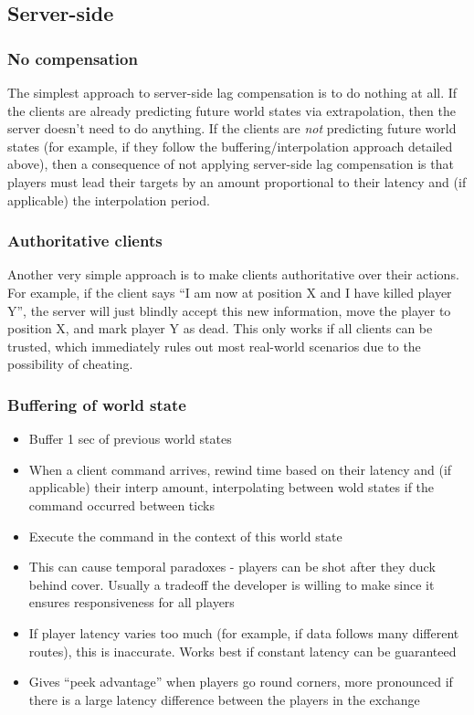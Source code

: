 \documentclass[conference]{IEEEtran}
\begin{document}
	\subsection{Server-side}

	\subsubsection{No compensation}

	The simplest approach to server-side lag compensation is to do nothing at all. If the clients are already predicting future world states via extrapolation, then the server doesn't need to do anything. If the clients are \emph{not} predicting future world states (for example, if they follow the buffering/interpolation approach detailed above), then a consequence of not applying server-side lag compensation is that players must lead their targets by an amount proportional to their latency and (if applicable) the interpolation period.

	\subsubsection{Authoritative clients}

	Another very simple approach is to make clients authoritative over their actions. For example, if the client says ``I am now at position X and I have killed player Y'', the server will just blindly accept this new information, move the player to position X, and mark player Y as dead. This only works if all clients can be trusted, which immediately rules out most real-world scenarios due to the possibility of cheating.

	\subsubsection{Buffering of world state}

	\cite{bernier2001latency}

	\begin{itemize}
		\item Buffer 1 sec of previous world states
		\item When a client command arrives, rewind time based on their latency and (if applicable) their interp amount, interpolating between wold states if the command occurred between ticks
		\item Execute the command in the context of this world state
		\item This can cause temporal paradoxes - players can be shot after they duck behind cover. Usually a tradeoff the developer is willing to make since it ensures responsiveness for all players
		\item If player latency varies too much (for example, if data follows many different routes), this is inaccurate. Works best if constant latency can be guaranteed
		\item Gives ``peek advantage'' when players go round corners, more pronounced if there is a large latency difference between the players in the exchange
	\end{itemize}
\end{document}
